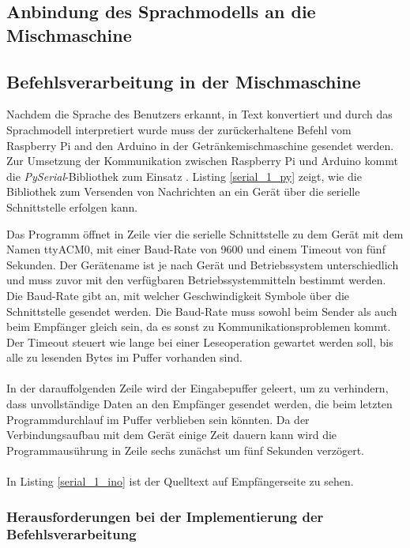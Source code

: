 \subsection{Anbindung des Sprachmodells an die Mischmaschine}
\subsection{Befehlsverarbeitung in der Mischmaschine}\label{section:Befehlsverarbeitung}
Nachdem die Sprache des Benutzers erkannt, in Text konvertiert und durch das Sprachmodell interpretiert wurde muss der zurückerhaltene Befehl vom Raspberry Pi and den Arduino in der Getränkemischmaschine gesendet werden. Zur Umsetzung der Kommunikation zwischen Raspberry Pi und Arduino kommt die \textit{PySerial}-Bibliothek zum Einsatz \cite{pyserial}. Listing \ref{serial_1_py} zeigt, wie die Bibliothek zum Versenden von Nachrichten an ein Gerät über die serielle Schnittstelle erfolgen kann.

Das Programm öffnet in Zeile vier die serielle Schnittstelle zu dem Gerät mit dem Namen \glqq{}ttyACM0\grqq{}, mit einer Baud-Rate von 9600 und einem Timeout von fünf Sekunden. Der Gerätename ist je nach Gerät und Betriebssystem unterschiedlich und muss zuvor mit den verfügbaren Betriebssystemmitteln bestimmt werden. Die Baud-Rate gibt an, mit welcher Geschwindigkeit Symbole über die Schnittstelle gesendet werden. Die Baud-Rate muss sowohl beim Sender als auch beim Empfänger gleich sein, da es sonst zu Kommunikationsproblemen kommt. Der Timeout steuert wie lange bei einer Leseoperation gewartet werden soll, bis alle zu lesenden Bytes im Puffer vorhanden sind.\\\\
In der darauffolgenden Zeile wird der Eingabepuffer geleert, um zu verhindern, dass unvollständige Daten an den Empfänger gesendet werden, die beim letzten Programmdurchlauf im Puffer verblieben sein könnten. Da der Verbindungsaufbau mit dem Gerät einige Zeit dauern kann wird die Programmausührung in Zeile sechs zunächst um fünf Sekunden verzögert.\\\\
In Listing \ref{serial_1_ino} ist der Quelltext auf Empfängerseite zu sehen.

\subsubsection{Herausforderungen bei der Implementierung der Befehlsverarbeitung}
\endinput


